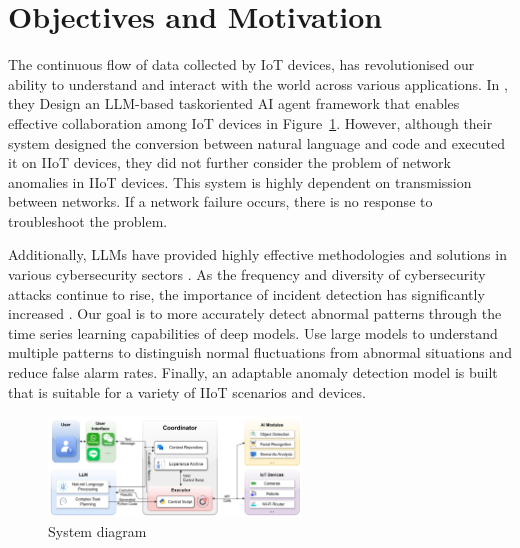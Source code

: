 \documentclass[usenatbib]{tjaa}
\begin{document}


\section{Objectives and Motivation}
\label{sec:objectives}

The continuous flow of data collected by IoT devices, has revolutionised
our ability to understand and interact with the world across various applications\citep{shirali2024llm}.
In \citet{cui2024llmind}, they Design an LLM-based taskoriented AI agent framework that enables effective collaboration
among IoT devices in Figure~\ref{fig:llmFramwork}\citep{cui2024llmind}.
However, although their system designed the conversion between natural
language and code and executed it on IIoT devices,
they did not further consider the problem of network anomalies in IIoT devices.
This system is highly dependent on transmission between networks.
If a network failure occurs, there is no response to troubleshoot the problem.

Additionally, LLMs have provided highly effective methodologies and solutions
in various cybersecurity sectors \citep{mohamed2024efficient}.
As the frequency and diversity of cybersecurity attacks continue to rise, the
importance of incident detection has significantly increased \citep{thandi2024revolutionizing}.
Our goal is to more accurately detect abnormal patterns through the time series learning capabilities
of deep models. Use large models to understand multiple patterns to distinguish normal fluctuations from
abnormal situations and reduce false alarm rates.
Finally, an adaptable anomaly detection model is built that is suitable for a variety of IIoT scenarios and devices.

\begin{figure}
  \centering
  \includegraphics[width=0.6\textwidth]{./img/system_diagram.png} %
  \caption{System diagram}
  \label{fig:llmFramwork}
\end{figure}
\end{document}
